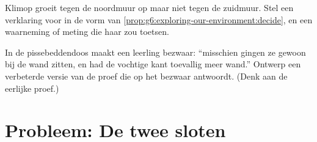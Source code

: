 \begin{exercise}[$\star\star$]\label{exo:g6:exploring-our-environment:11}
Klimop groeit tegen de noordmuur op maar niet tegen de zuidmuur. Stel een
verklaring voor in de vorm van
\cref{prop:g6:exploring-our-environment:decide}, en een waarneming of
meting die haar zou toetsen.
\end{exercise}

\begin{exercise}[$\star\star\star$]\label{exo:g6:exploring-our-environment:12}
In de pissebeddendoos maakt een leerling bezwaar: ``misschien gingen ze
gewoon bij de wand zitten, en had de vochtige kant toevallig meer wand.''
Ontwerp een verbeterde versie van de proef die op het bezwaar antwoordt.
(Denk aan de eerlijke proef.)
\end{exercise}

\section{Probleem: De twee sloten}

